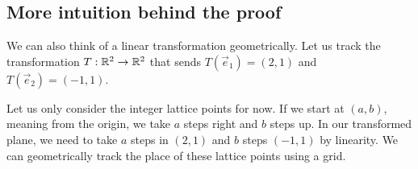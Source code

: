 \subsection*{More intuition behind the proof}
We can also think of a linear transformation geometrically.
Let us track the transformation $T:\mathbb{R}^2\to\mathbb{R}^2$ that sends $T(\vec{e}_1)= (2,1)$ and $T(\vec{e}_2)=(-1,1)$.
\begin{figure}[h]
	\centering
	\begin{subfigure}[l]{0.15\textwidth}
	\end{subfigure}
	\centering
	\begin{subfigure}{0.3\textwidth}
	\end{subfigure}
	\begin{subfigure}[r]{0.4\textwidth}
	\end{subfigure}
\end{figure}
Let us only consider the integer lattice points for now. If we start at $(a,b)$, meaning from the origin, we take $a$ steps right and $b$ steps up. In our transformed plane, we need to take $a$ steps in $(2,1)$ and $b$ steps $(-1,1)$ by linearity. We can geometrically track the place of these lattice points using a grid.
